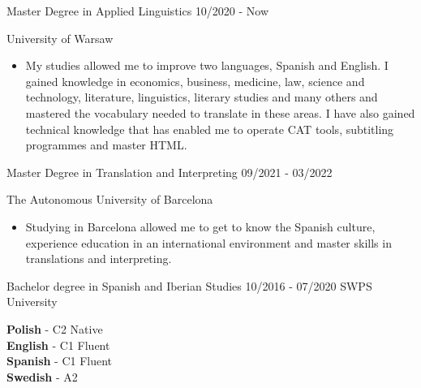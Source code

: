 \documentclass[11pt]{formatting/format} %
\begin{document}
\begin{entrylist}
    \entry
        {\color{text} }
        {\color{text} \Large Master Degree in Applied Linguistics}
        {\color{text} \large 10/2020 - Now}
        {\color{text} \large University of Warsaw \\  
         \begin{itemize}
       \item \normalsize  My studies allowed me to improve two languages, Spanish and English. I gained knowledge in economics, business, medicine, law, science and technology, literature, linguistics, literary studies and many others and mastered the vocabulary needed to translate in these areas. I have also gained technical knowledge that has enabled me to operate CAT tools, subtitling programmes and master HTML.\\
        \end{itemize}}

    \entry
        {\color{text} }
        {\color{text} \Large Master Degree in Translation and Interpreting}
        {\color{text} \large 09/2021 - 03/2022}
        {\color{text} \large The Autonomous University of Barcelona \\  
         \begin{itemize}
       \item \normalsize  Studying in Barcelona allowed me to get to know the Spanish culture, experience education in an international environment and master skills in translations and
interpreting.\\
        \end{itemize}}

    \entry
        {\color{text} }
        {\color{text} \Large Bachelor degree in Spanish and Iberian Studies}
        {\color{text} \large 10/2016 - 07/2020}
        {\color{text} \large SWPS University} \\    
\end{entrylist}


\color{text}\textbf{Polish }  - C2 Native \\
\color{text}\textbf{English}  - C1 Fluent \\
\color{text}\textbf{Spanish}  - C1 Fluent \\
\color{text}\textbf{Swedish} - A2  \\
\end{document}
